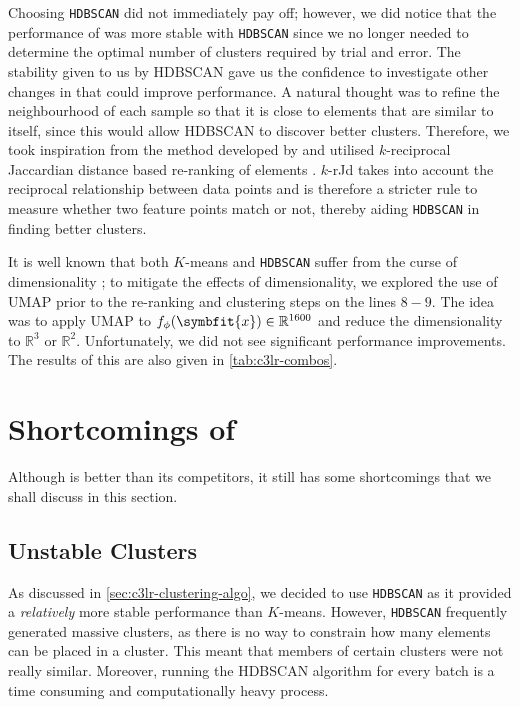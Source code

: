Choosing \texttt{HDBSCAN} did not immediately pay off; however, we did notice that the performance of \ccclr{} was more stable with \texttt{HDBSCAN} since we no longer needed to determine the optimal number of clusters required by trial and error. 
The stability given to us by HDBSCAN gave us the confidence to investigate other changes in \ccclr{} that could improve performance. A natural thought was to refine the neighbourhood of each sample so that it is close to elements that are similar to itself, since this would allow HDBSCAN to discover better clusters. Therefore, we took inspiration from the method developed by \textcite{Ji2019UnsupervisedTraining} and utilised $k$-reciprocal Jaccardian distance based re-ranking of elements \parencite{ZhongRe-rankingEncoding}. $k$-rJd takes into account the reciprocal relationship between
data points and is therefore a stricter rule to measure whether two feature points match or not, thereby aiding \texttt{HDBSCAN} in finding better clusters.

It is well known that both $K$-means and \texttt{HDBSCAN} suffer from the curse of dimensionality \parencite{Kriegel09, McInnes2017Hdbscan:Clustering}; to mitigate the effects of dimensionality, we explored the use of UMAP \parencite{mcinnes2018umap} prior to the re-ranking and clustering steps on the lines $8-9$.
The idea was to apply UMAP to $f_\phi(\symbfit{x}) \in \mathbb{R}^{1600}$ and reduce the dimensionality to $\mathbb{R}^3$ or $\mathbb{R}^2$.
Unfortunately, we did not see significant performance improvements. The results of this are also given in \cref{tab:c3lr-combos}.



\section{Shortcomings of \ccclr{}}\label{sec:c3lr-shortcomes}

Although \ccclr{} is better than its competitors, it still has some shortcomings that we shall discuss in this section.

\subsection{Unstable Clusters}\label{ssec:unstable-clusters}

As discussed in \cref{sec:c3lr-clustering-algo}, we decided to use \texttt{HDBSCAN} as it provided a \textit{relatively} more stable performance than $K$-means. However, \texttt{HDBSCAN} frequently generated massive clusters, as there is no way to constrain how many elements can be placed in a cluster. This meant that members of certain clusters were not really similar. Moreover, running the HDBSCAN algorithm for every batch is a time consuming and computationally heavy process.

